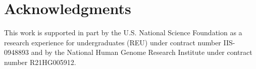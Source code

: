 \section*{Acknowledgments} This work is supported in part by the U.S. National
Science Foundation as a research experience for undergraduates (REU) under
contract number IIS-0948893 and by the National Human Genome Research Institute
under contract number R21HG005912.

%


